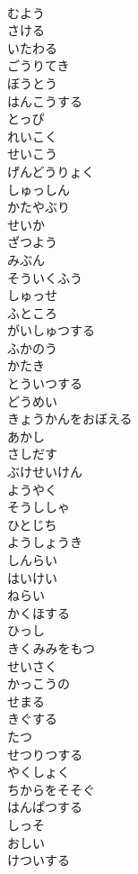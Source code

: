\documentclass[8pt]{extreport}
\begin{document}
\begin{CJK}{UTF8}{min}
\\	むよう
\\	さける
\\	いたわる
\\	ごうりてき
\\	ぼうとう
\\	はんこうする
\\	とっぴ
\\	れいこく
\\	せいこう
\\	げんどうりょく
\\	しゅっしん
\\	かたやぶり
\\	せいか
\\	ざつよう
\\	みぶん
\\	そういくふう
\\	しゅっせ
\\	ふところ
\\	がいしゅつする
\\	ふかのう
\\	かたき
\\	とういつする
\\	どうめい
\\	きょうかんをおぼえる
\\	あかし
\\	さしだす
\\	ぶけせいけん
\\	ようやく
\\	そうししゃ
\\	ひとじち
\\	ようしょうき
\\	しんらい
\\	はいけい
\\	ねらい
\\	かくほする
\\	ひっし
\\	きくみみをもつ
\\	せいさく
\\	かっこうの
\\	せまる
\\	きぐする
\\	たつ
\\	せつりつする
\\	やくしょく
\\	ちからをそそぐ
\\	はんぱつする
\\	しっそ
\\	おしい
\\	けついする

\end{CJK}
\end{document}
